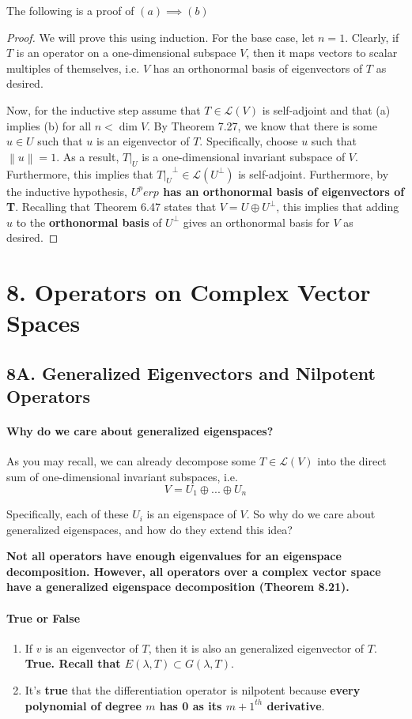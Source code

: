 \documentclass{article}
\newcommand{\norm}[1]{\left\lVert#1\right\rVert}
\begin{document}
The following is a proof of $(a) \implies (b)$
\begin{proof}
We will prove this using induction. For the base case, let $n = 1$. Clearly, if $T$ is an operator on a one-dimensional subspace $V$, then it maps vectors to scalar multiples of themselves, i.e. $V$ has an orthonormal basis of eigenvectors of $T$ as desired.

\bigskip

Now, for the inductive step assume that $T \in \mathcal{L}(V)$ is self-adjoint and that (a) implies (b) for all $n < \dim{V}$. By Theorem 7.27, we know that there is some $u \in U$ such that $u$ is an eigenvector of $T$. Specifically, choose $u$ such that $\norm{u} = 1$. As a result, $T|_U$ is a one-dimensional invariant subspace of $V$. Furthermore, this implies that ${T|_U}^\perp \in \mathcal{L}(U^\perp)$ is self-adjoint. Furthermore, by the inductive hypothesis, \textbf{$U^perp$ has an orthonormal basis of eigenvectors of T}. Recalling that Theorem 6.47 states that $V = U \oplus U^\perp$, this implies that adding $u$ to the \textbf{orthonormal basis} of $U^\perp$ gives an orthonormal basis for $V$ as desired.
\end{proof}

\section*{8. Operators on Complex Vector Spaces}
\subsection*{8A. Generalized Eigenvectors and Nilpotent Operators}
\paragraph{Why do we care about generalized eigenspaces?}
As you may recall, we can already decompose some $T \in \mathcal{L}(V)$ into the direct sum of one-dimensional invariant subspaces, i.e.
\[ V = U_1 \oplus ... \oplus U_n \]

Specifically, each of these $U_i$ is an eigenspace of $V$. So why do we care about generalized eigenspaces, and how do they extend this idea? 


\textbf{Not all operators have enough eigenvalues for an eigenspace decomposition. However, all operators over a complex vector space have a generalized eigenspace decomposition (Theorem 8.21).}

\paragraph{True or False}
\begin{enumerate}
    \item If $v$ is an eigenvector of $T$, then it is also an generalized eigenvector of $T$. \textbf{True. Recall that $E(\lambda, T) \subset G(\lambda, T)$}.

    \item It's \textbf{true} that the differentiation operator is nilpotent because \textbf{every polynomial of degree $m$ has 0 as its $m + 1^{th}$ derivative}.
\end{enumerate}
\end{document}
